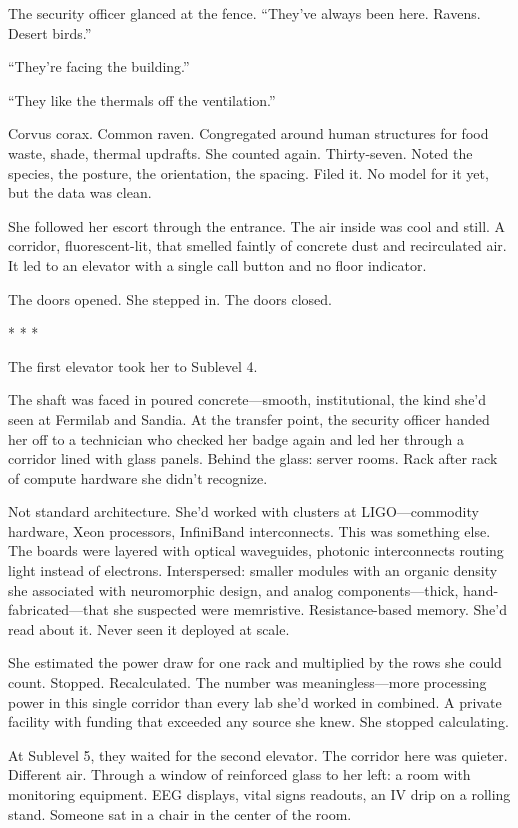 \documentclass[12pt]{article}
\newcommand{\scenebreak}{\begin{center}* * *\end{center}}
\begin{document}
The security officer glanced at the fence. ``They've always been here. Ravens. Desert birds.''

``They're facing the building.''

``They like the thermals off the ventilation.''

Corvus corax. Common raven. Congregated around human structures for food waste, shade, thermal updrafts. She counted again. Thirty-seven. Noted the species, the posture, the orientation, the spacing. Filed it. No model for it yet, but the data was clean.

She followed her escort through the entrance. The air inside was cool and still. A corridor, fluorescent-lit, that smelled faintly of concrete dust and recirculated air. It led to an elevator with a single call button and no floor indicator.

The doors opened. She stepped in. The doors closed.

\scenebreak

The first elevator took her to Sublevel 4.

The shaft was faced in poured concrete---smooth, institutional, the kind she'd seen at Fermilab and Sandia. At the transfer point, the security officer handed her off to a technician who checked her badge again and led her through a corridor lined with glass panels. Behind the glass: server rooms. Rack after rack of compute hardware she didn't recognize.

Not standard architecture. She'd worked with clusters at LIGO---commodity hardware, Xeon processors, InfiniBand interconnects. This was something else. The boards were layered with optical waveguides, photonic interconnects routing light instead of electrons. Interspersed: smaller modules with an organic density she associated with neuromorphic design, and analog components---thick, hand-fabricated---that she suspected were memristive. Resistance-based memory. She'd read about it. Never seen it deployed at scale.

She estimated the power draw for one rack and multiplied by the rows she could count. Stopped. Recalculated. The number was meaningless---more processing power in this single corridor than every lab she'd worked in combined. A private facility with funding that exceeded any source she knew. She stopped calculating.

At Sublevel 5, they waited for the second elevator. The corridor here was quieter. Different air. Through a window of reinforced glass to her left: a room with monitoring equipment. EEG displays, vital signs readouts, an IV drip on a rolling stand. Someone sat in a chair in the center of the room.
\end{document}
